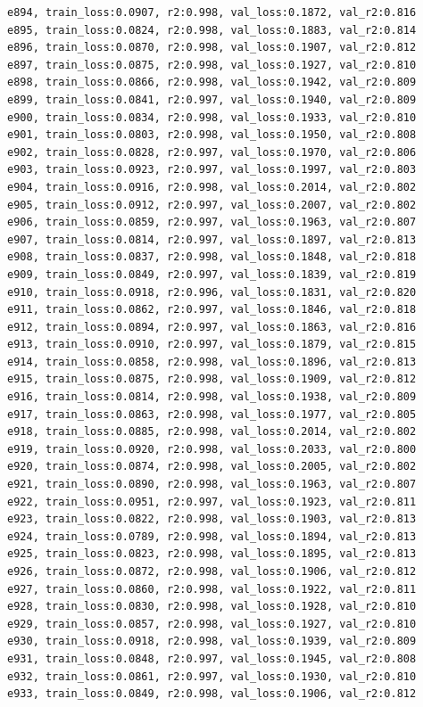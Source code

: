 \documentclass[a4paper, 12pt]{article}
\begin{document}
\begin{lstlisting}
e894, train_loss:0.0907, r2:0.998, val_loss:0.1872, val_r2:0.816
e895, train_loss:0.0824, r2:0.998, val_loss:0.1883, val_r2:0.814
e896, train_loss:0.0870, r2:0.998, val_loss:0.1907, val_r2:0.812
e897, train_loss:0.0875, r2:0.998, val_loss:0.1927, val_r2:0.810
e898, train_loss:0.0866, r2:0.998, val_loss:0.1942, val_r2:0.809
e899, train_loss:0.0841, r2:0.997, val_loss:0.1940, val_r2:0.809
e900, train_loss:0.0834, r2:0.998, val_loss:0.1933, val_r2:0.810
e901, train_loss:0.0803, r2:0.998, val_loss:0.1950, val_r2:0.808
e902, train_loss:0.0828, r2:0.997, val_loss:0.1970, val_r2:0.806
e903, train_loss:0.0923, r2:0.997, val_loss:0.1997, val_r2:0.803
e904, train_loss:0.0916, r2:0.998, val_loss:0.2014, val_r2:0.802
e905, train_loss:0.0912, r2:0.997, val_loss:0.2007, val_r2:0.802
e906, train_loss:0.0859, r2:0.997, val_loss:0.1963, val_r2:0.807
e907, train_loss:0.0814, r2:0.997, val_loss:0.1897, val_r2:0.813
e908, train_loss:0.0837, r2:0.998, val_loss:0.1848, val_r2:0.818
e909, train_loss:0.0849, r2:0.997, val_loss:0.1839, val_r2:0.819
e910, train_loss:0.0918, r2:0.996, val_loss:0.1831, val_r2:0.820
e911, train_loss:0.0862, r2:0.997, val_loss:0.1846, val_r2:0.818
e912, train_loss:0.0894, r2:0.997, val_loss:0.1863, val_r2:0.816
e913, train_loss:0.0910, r2:0.997, val_loss:0.1879, val_r2:0.815
e914, train_loss:0.0858, r2:0.998, val_loss:0.1896, val_r2:0.813
e915, train_loss:0.0875, r2:0.998, val_loss:0.1909, val_r2:0.812
e916, train_loss:0.0814, r2:0.998, val_loss:0.1938, val_r2:0.809
e917, train_loss:0.0863, r2:0.998, val_loss:0.1977, val_r2:0.805
e918, train_loss:0.0885, r2:0.998, val_loss:0.2014, val_r2:0.802
e919, train_loss:0.0920, r2:0.998, val_loss:0.2033, val_r2:0.800
e920, train_loss:0.0874, r2:0.998, val_loss:0.2005, val_r2:0.802
e921, train_loss:0.0890, r2:0.998, val_loss:0.1963, val_r2:0.807
e922, train_loss:0.0951, r2:0.997, val_loss:0.1923, val_r2:0.811
e923, train_loss:0.0822, r2:0.998, val_loss:0.1903, val_r2:0.813
e924, train_loss:0.0789, r2:0.998, val_loss:0.1894, val_r2:0.813
e925, train_loss:0.0823, r2:0.998, val_loss:0.1895, val_r2:0.813
e926, train_loss:0.0872, r2:0.998, val_loss:0.1906, val_r2:0.812
e927, train_loss:0.0860, r2:0.998, val_loss:0.1922, val_r2:0.811
e928, train_loss:0.0830, r2:0.998, val_loss:0.1928, val_r2:0.810
e929, train_loss:0.0857, r2:0.998, val_loss:0.1927, val_r2:0.810
e930, train_loss:0.0918, r2:0.998, val_loss:0.1939, val_r2:0.809
e931, train_loss:0.0848, r2:0.997, val_loss:0.1945, val_r2:0.808
e932, train_loss:0.0861, r2:0.997, val_loss:0.1930, val_r2:0.810
e933, train_loss:0.0849, r2:0.998, val_loss:0.1906, val_r2:0.812

\end{lstlisting}
\end{document}
